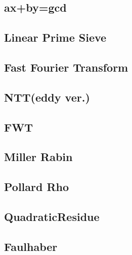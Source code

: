 \documentclass[a4paper,10pt,twocolumn,oneside]{article}
\begin{document}
\subsection{ax+by=gcd}


\subsection{Linear Prime Sieve}


\subsection{Fast Fourier Transform}


\subsection{NTT(eddy ver.)}


\subsection{FWT}


\subsection{Miller Rabin}


\subsection{Pollard Rho}


% 

 \subsection{QuadraticResidue}
 

\subsection{Faulhaber}

\end{document}
